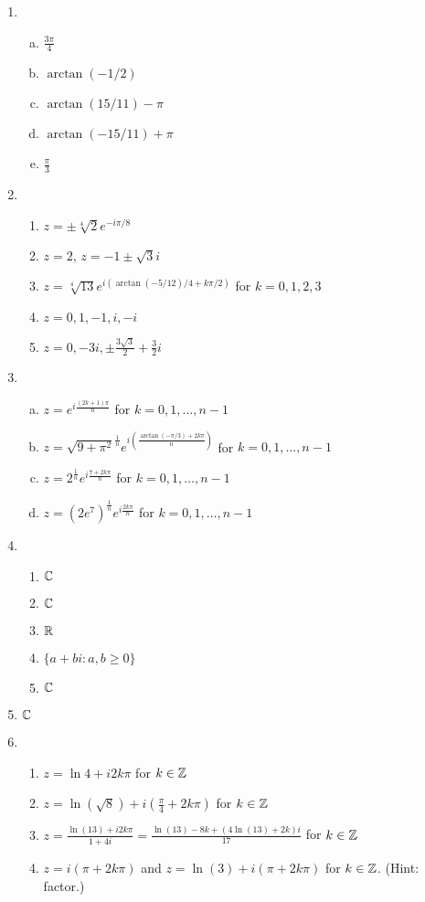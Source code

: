 \begin{enumerate}
\item \begin{enumerate}[a)]
\item $\frac{3\pi}{4}$
\item $\arctan(-1/2)$
\item $\arctan(15/11) - \pi$
\item $\arctan(-15/11) + \pi$
\item $\frac{\pi}{3}$

\end{enumerate}

\item \begin{enumerate}
\item $z = \pm \sqrt[4]{2}e^{-i\pi/8}$
\item $z = 2$, $z = -1\pm \sqrt{3}i$
\item $z = \sqrt[4]{13}e^{i(\arctan(-5/12)/4 + k\pi/2)}$ for $k = 0,1,2,3$
\item $z = 0, 1, -1, i, -i$
\item $z = 0, -3i, \pm\frac{3\sqrt{3}}{2} + \frac{3}{2}i$
\end{enumerate}

\item \begin{enumerate}[a)]
\item $z = e^{i\frac{(2k+1)\pi}{n}}$ for $k = 0,1,\dots, n-1$
\item $z = \sqrt{9 + \pi^2}^{\frac{1}{n}}e^{i(\frac{\arctan(-\pi/3) + 2k\pi}{n})}$ for $k = 0,1,\dots, n-1$
\item $z = 2^{\frac{1}{n}}e^{i\frac{7 + 2k\pi}{n}}$ for $k = 0,1,\dots,n-1$
\item $z = (2e^7)^{\frac{1}{n}}e^{i\frac{2k\pi}{n}}$ for $k=0,1,\dots,n-1$

\end{enumerate}

\item \begin{enumerate}\item $\mathbb{C}$
\item $\mathbb{C}$
\item $\mathbb{R}$
\item $\{a+bi: a,b\ge 0\}$
\item $\mathbb{C}$
\end{enumerate}

\item $\mathbb{C}$

\item \begin{enumerate}
\item $z = \ln 4 + i2k\pi$ for $k\in \mathbb{Z}$
\item $z = \ln(\sqrt{8}) + i(\frac{\pi}{4} + 2k\pi)$ for $k\in\mathbb{Z}$
\item $z = \frac{\ln(13) + i2k\pi}{1+4i} = \frac{\ln(13) - 8k + (4\ln(13) + 2k)i}{17}$ for $k\in\mathbb{Z}$
\item $z = i(\pi + 2k\pi)$ and $z = \ln(3) +i(\pi + 2k\pi)$ for $k\in \mathbb{Z}$. (Hint: factor.)


\end{enumerate}
\end{enumerate}

